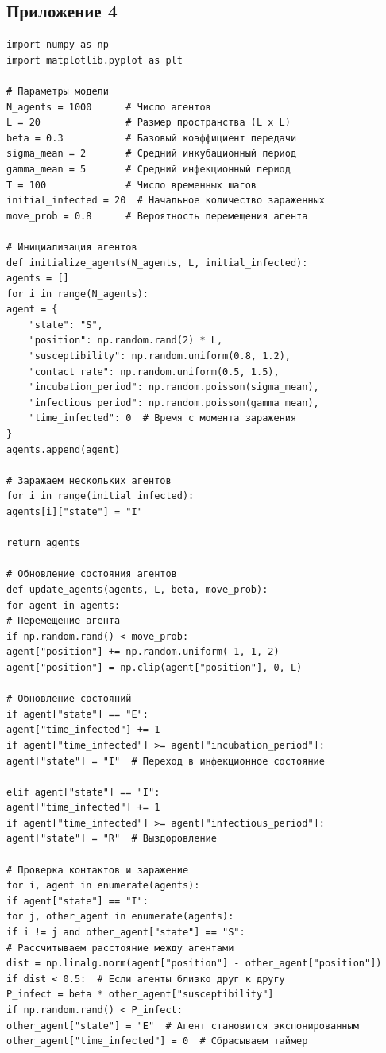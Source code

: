 \documentclass[a4paper, 14pt]{extreport}
\begin{document}
\subsection*{Приложение 4}
\begin{verbatim}
import numpy as np
import matplotlib.pyplot as plt

# Параметры модели
N_agents = 1000      # Число агентов
L = 20               # Размер пространства (L x L)
beta = 0.3           # Базовый коэффициент передачи
sigma_mean = 2       # Средний инкубационный период
gamma_mean = 5       # Средний инфекционный период
T = 100              # Число временных шагов
initial_infected = 20  # Начальное количество зараженных
move_prob = 0.8      # Вероятность перемещения агента

# Инициализация агентов
def initialize_agents(N_agents, L, initial_infected):
agents = []
for i in range(N_agents):
agent = {
	"state": "S", 
	"position": np.random.rand(2) * L,  
	"susceptibility": np.random.uniform(0.8, 1.2), 
	"contact_rate": np.random.uniform(0.5, 1.5), 
	"incubation_period": np.random.poisson(sigma_mean), 
	"infectious_period": np.random.poisson(gamma_mean), 
	"time_infected": 0  # Время с момента заражения
}
agents.append(agent)

# Заражаем нескольких агентов
for i in range(initial_infected):
agents[i]["state"] = "I"

return agents

# Обновление состояния агентов
def update_agents(agents, L, beta, move_prob):
for agent in agents:
# Перемещение агента
if np.random.rand() < move_prob:
agent["position"] += np.random.uniform(-1, 1, 2)
agent["position"] = np.clip(agent["position"], 0, L)

# Обновление состояний
if agent["state"] == "E":
agent["time_infected"] += 1
if agent["time_infected"] >= agent["incubation_period"]:
agent["state"] = "I"  # Переход в инфекционное состояние

elif agent["state"] == "I":
agent["time_infected"] += 1
if agent["time_infected"] >= agent["infectious_period"]:
agent["state"] = "R"  # Выздоровление

# Проверка контактов и заражение
for i, agent in enumerate(agents):
if agent["state"] == "I":
for j, other_agent in enumerate(agents):
if i != j and other_agent["state"] == "S":
# Рассчитываем расстояние между агентами
dist = np.linalg.norm(agent["position"] - other_agent["position"])
if dist < 0.5:  # Если агенты близко друг к другу
P_infect = beta * other_agent["susceptibility"]
if np.random.rand() < P_infect:
other_agent["state"] = "E"  # Агент становится экспонированным
other_agent["time_infected"] = 0  # Сбрасываем таймер


\end{verbatim}
\end{document}
